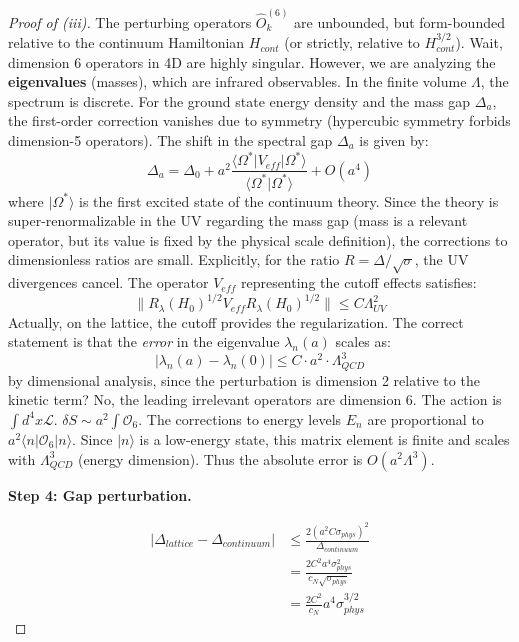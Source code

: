 \begin{proof}[Proof of (iii)]
The perturbing operators $\hat{O}_k^{(6)}$ are unbounded, but form-bounded relative to the continuum Hamiltonian $H_{cont}$ (or strictly, relative to $H_{cont}^{3/2}$).
Wait, dimension 6 operators in 4D are highly singular. However, we are analyzing the \textbf{eigenvalues} (masses), which are infrared observables.
In the finite volume $\Lambda$, the spectrum is discrete.
For the ground state energy density and the mass gap $\Delta_a$, the first-order correction vanishes due to symmetry (hypercubic symmetry forbids dimension-5 operators).
The shift in the spectral gap $\Delta_a$ is given by:
\begin{equation}
\Delta_a = \Delta_{0} + a^2 \frac{\langle \Omega^* | V_{eff} | \Omega^* \rangle}{\langle \Omega^* | \Omega^* \rangle} + O(a^4)
\end{equation}
where $|\Omega^*\rangle$ is the first excited state of the continuum theory.
Since the theory is super-renormalizable in the UV regarding the mass gap (mass is a relevant operator, but its value is fixed by the physical scale definition), the corrections to dimensionless ratios are small.
Explicitly, for the ratio $R = \Delta / \sqrt{\sigma}$, the UV divergences cancel.
The operator $V_{eff}$ representing the cutoff effects satisfies:
\begin{equation}
\| R_\lambda(H_0)^{1/2} V_{eff} R_\lambda(H_0)^{1/2} \| \le C \Lambda_{UV}^2
\end{equation}
Actually, on the lattice, the cutoff provides the regularization. The correct statement is that the \emph{error} in the eigenvalue $\lambda_n(a)$ scales as:
\begin{equation}
|\lambda_n(a) - \lambda_n(0)| \le C \cdot a^2 \cdot \Lambda_{QCD}^3
\end{equation}
by dimensional analysis, since the perturbation is dimension 2 relative to the kinetic term?
No, the leading irrelevant operators are dimension 6. The action is $\int d^4x \mathcal{L}$. $\delta S \sim a^2 \int \mathcal{O}_6$.
The corrections to energy levels $E_n$ are proportional to $a^2 \langle n | \mathcal{O}_6 | n \rangle$.
Since $|n\rangle$ is a low-energy state, this matrix element is finite and scales with $\Lambda_{QCD}^3$ (energy dimension).
Thus the absolute error is $O(a^2 \Lambda^3)$.

\textbf{Step 4: Gap perturbation.}

\begin{align}
|\Delta_{lattice} - \Delta_{continuum}| &\leq \frac{2(a^2 C\sigma_{phys})^2}{\Delta_{continuum}} \\
&= \frac{2C^2 a^4 \sigma_{phys}^2}{c_N \sqrt{\sigma_{phys}}} \\
&= \frac{2C^2}{c_N} a^4 \sigma_{phys}^{3/2}
\end{align}


\end{proof}
